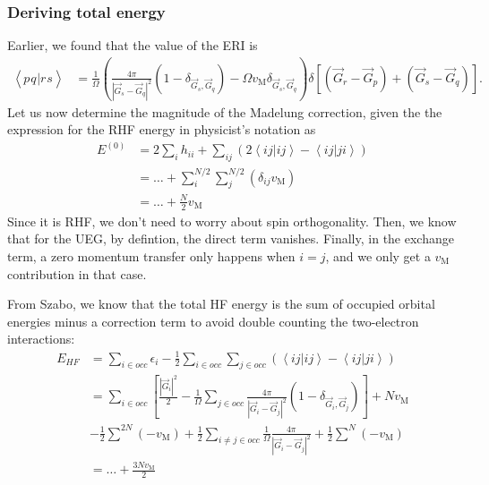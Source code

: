 \subsubsection{Deriving total energy}
Earlier, we found that the value of the ERI is
\begin{align}
\left< p_{} q_{} | r_{} s_{} \right> & = \frac{1}{\Omega} \left(\frac{4 \pi}{\left|\vec{G}_s-\vec{G}_q\right|^2} \left(1-\delta_{\vec{G}_s,\vec{G}_q}\right) - \Omega v_{\mathrm{M}}\delta_{\vec{G}_s,\vec{G}_q}\right) \delta\left[\left(\vec{G}_r-\vec{G}_p\right)+\left(\vec{G}_s-\vec{G}_q\right)\right] .
\end{align}
Let us now determine the magnitude of the Madelung correction, given the the expression for the RHF energy in physicist's notation as
\begin{align}
E^{(0)}&=2 \sum_i h_{i i}+\sum_{i j}\left(2 \left<ij|ij\right> - \left<ij|ji\right> \right) \label{eq:RHFE0} \\
&= \ldots + \sum_i^{N/2} \sum_j^{N/2} \left( \delta_{ij} v_{\mathrm{M}} \right) \label{eq:RHFE1} \\
&= \ldots + \frac{N}{2} v_{\mathrm{M}}
\end{align}
Since it is RHF, we don't need to worry about spin orthogonality. Then, we know that for the UEG, by defintion, the direct term vanishes.
Finally, in the exchange term, a zero momentum transfer only happens when $i=j$, and we only get a $v_{\mathrm{M}}$ contribution in that case. 

From Szabo, we know that the total HF energy is the sum of occupied orbital energies minus a correction term to avoid double counting the two-electron interactions:
\begin{align}
E_{HF} & = \sum_{i\in occ} \epsilon_i - \frac{1}{2} \sum_{i\in occ} \sum_{j\in occ} \left( \left<ij|ij\right> - \left<ij|ji\right> \right) \\
&= \sum_{i\in occ} \left[ \frac{|\vec{G}_i|^2}{2} -\frac{1}{\Omega} \sum_{j\in occ} \frac{4 \pi }{\left|\vec{G}_i-\vec{G}_j\right|^2} \left(1-\delta_{\vec{G}_i,\vec{G}_j}\right) \right] + N v_{\mathrm{M}} \\
&- \frac{1}{2} \sum^{2N} \left(- v_{\mathrm{M}}\right) + \frac{1}{2} \sum_{i\neq j\in occ} \frac{1}{\Omega} \frac{4 \pi }{\left|\vec{G}_i-\vec{G}_j\right|^2} + \frac{1}{2} \sum^N \left( - v_{\mathrm{M}}\right) \\
&= \ldots + \frac{3N v_{\mathrm{M}}}{2}
\end{align}
